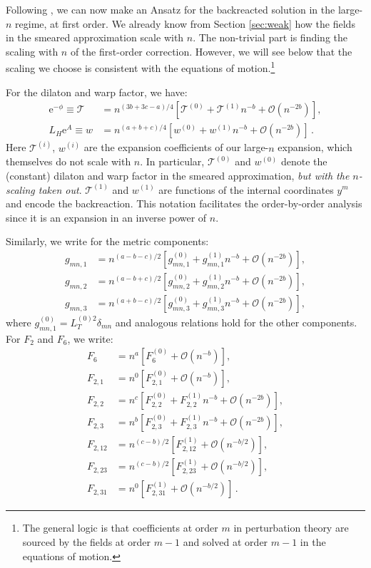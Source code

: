 \documentclass[11pt]{article}
\renewcommand{\[}{\left[}
\renewcommand{\]}{\right]}
\renewcommand{\(}{\left(}
\renewcommand{\)}{\right)}
\newcommand{\e}{\textrm{e}}
\newcommand{\<}{\langle}
\renewcommand{\>}{\rangle}
\begin{document}
Following \cite{Junghans:2020acz}, we can now make an Ansatz for the backreacted solution in the large-$n$ regime, at first order. We already know from Section \ref{sec:weak} how the fields in the smeared approximation scale with $n$. The non-trivial part is finding the scaling with $n$ of the first-order correction. However, we will see below that the scaling we choose is consistent with the equations of motion.\footnote{The general logic is that coefficients at order $m$ in perturbation theory are sourced by the fields at order $m-1$ and solved at order $m-1$ in the equations of motion.}

For the dilaton and warp factor, we have:
\begin{align}
\e^{-\phi} \equiv \mathcal{T} &= n^{(3b+3c-a)/4} \left[\mathcal{T}^{(0)} + \mathcal{T}^{(1)}n^{-b} + \mathcal{O}(n^{-2b})\right], \label{ansatzw} \\
 L_H \e^{A} \equiv w &= n^{(a+b+c)/4} \left[w^{(0)} + w^{(1)}n^{-b} + \mathcal{O}(n^{-2b})\right]\,. \label{sol}  
\end{align}
Here $\mathcal{T}^{(i)}$, $w^{(i)}$ are the expansion coefficients of our large-$n$ expansion, which themselves do not scale with $n$. In particular, $\mathcal{T}^{(0)}$ and $w^{(0)}$ denote the (constant) dilaton and warp factor in the smeared approximation, \emph{but with the $n$-scaling taken out}. $\mathcal{T}^{(1)}$ and $w^{(1)}$ are functions of the internal coordinates $y^m$ and encode the backreaction. This notation facilitates the order-by-order analysis since it is an expansion in an inverse power of $n$. 

Similarly, we write
for the metric components:
\begin{align}
g_{mn,1} &= n^{(a-b-c)/2} \left[g_{mn,1}^{(0)} + g_{mn,1}^{(1)}n^{-b} + \mathcal{O}(n^{-2b})\right], \\
g_{mn,2} &= n^{(a-b+c)/2} \left[g_{mn,2}^{(0)} + g_{mn,2}^{(1)}n^{-b} + \mathcal{O}(n^{-2b})\right], \\
g_{mn,3} &= n^{(a+b-c)/2} \left[g_{mn,3}^{(0)} + g_{mn,3}^{(1)}n^{-b} + \mathcal{O}(n^{-2b})\right], \label{ansatz}
\end{align}
where $g_{mn,1}^{(0)}=L_T^{(0)2}\delta_{mn}$ and analogous relations hold for the other components.
For $F_2$ and $F_6$, we write:
\begin{align}
F_6 &= n^a \left[F^{(0)}_6 + \mathcal{O}(n^{-b})\right], \label{ansatz0} \\
F_{2,1} &= n^{0}\left[F_{2,1}^{(0)} + \mathcal{O}(n^{-b})\right], \\
F_{2,2} &= n^{c}\left[F_{2,2}^{(0)} +F_{2,2}^{(1)}n^{-b}+ \mathcal{O}(n^{-2b})\right], \\
F_{2,3} &= n^{b}\left[F_{2,3}^{(0)}  +F_{2,3}^{(1)}n^{-b}+\mathcal{O}(n^{-2b})\right], \\
F_{2,12} &= n^{(c-b)/2}\left[F^{(1)}_{2,12} + \mathcal{O}(n^{-b/2})\right], \\
F_{2,23} &= n^{(c-b)/2}\left[ F^{(1)}_{2,23} + \mathcal{O}(n^{-b/2})\right], \\
F_{2,31} &= n^0\left[F^{(1)}_{2,31} + \mathcal{O}(n^{-b/2})\right]\,. \label{ansatzf}
\end{align}
\end{document}
